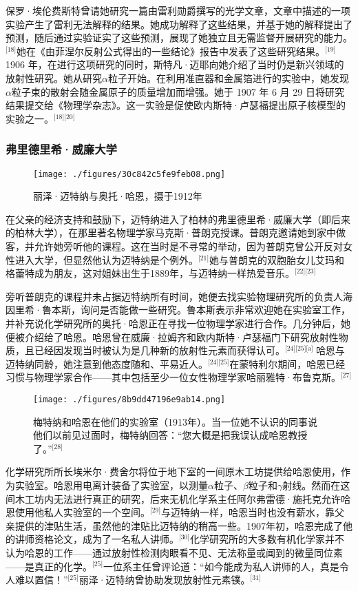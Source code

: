 保罗·埃伦费斯特曾请她研究一篇由雷利勋爵撰写的光学文章，文章中描述的一项实验产生了雷利无法解释的结果。她成功解释了这些结果，并基于她的解释提出了预测，随后通过实验证实了这些预测，展现了她独立且无需监督开展研究的能力。\(^\text{[18]}\)她在《由菲涅尔反射公式得出的一些结论》报告中发表了这些研究结果。\(^\text{[19]}\)1906 年，在进行这项研究的同时，斯特凡·迈耶向她介绍了当时仍是新兴领域的放射性研究。她从研究$\alpha$粒子开始。在利用准直器和金属箔进行的实验中，她发现$\alpha$粒子束的散射会随金属原子的质量增加而增强。她于 1907 年 6 月 29 日将研究结果提交给《物理学杂志》。这一实验是促使欧内斯特·卢瑟福提出原子核模型的实验之一。\(^\text{[18][20]}\)
\subsubsection{弗里德里希·威廉大学}
\begin{figure}[ht]
\centering
\texttt{[image: ./figures/30c842c5fe9feb08.png]}
\caption{丽泽·迈特纳与奥托·哈恩，摄于1912年} \label{fig_LZm_3}
\end{figure}
在父亲的经济支持和鼓励下，迈特纳进入了柏林的弗里德里希·威廉大学（即后来的柏林大学），在那里著名物理学家马克斯·普朗克授课。普朗克邀请她到家中做客，并允许她旁听他的课程。这在当时是不寻常的举动，因为普朗克曾公开反对女性进入大学，但显然他认为迈特纳是个例外。\(^\text{[21]}\)她与普朗克的双胞胎女儿艾玛和格蕾特成为朋友，这对姐妹出生于1889年，与迈特纳一样热爱音乐。\(^\text{[22][23]}\)

旁听普朗克的课程并未占据迈特纳所有时间，她便去找实验物理研究所的负责人海因里希·鲁本斯，询问是否能做一些研究。鲁本斯表示非常欢迎她在实验室工作，并补充说化学研究所的奥托·哈恩正在寻找一位物理学家进行合作。几分钟后，她便被介绍给了哈恩。哈恩曾在威廉·拉姆齐和欧内斯特·卢瑟福门下研究放射性物质，且已经因发现当时被认为是几种新的放射性元素而获得认可。\(^\text{[24][25][a] }\)哈恩与迈特纳同龄，她注意到他态度随和、平易近人。\(^\text{[24][25]}\)在蒙特利尔期间，哈恩已经习惯与物理学家合作——其中包括至少一位女性物理学家哈丽雅特·布鲁克斯。\(^\text{[27]}\)
\begin{figure}[ht]
\centering
\texttt{[image: ./figures/8b9dd47196e9ab14.png]}
\caption{梅特纳和哈恩在他们的实验室（1913年）。当一位她不认识的同事说他们以前见过面时，梅特纳回答：“您大概是把我误认成哈恩教授了。”\(^\text{[28]}\)} \label{fig_LZm_4}
\end{figure}
化学研究所所长埃米尔·费舍尔将位于地下室的一间原木工坊提供给哈恩使用，作为实验室。哈恩用电离计装备了实验室，以测量$\alpha$粒子、$\beta$粒子和$\gamma$射线。然而在这间木工坊内无法进行真正的研究，后来无机化学系主任阿尔弗雷德·施托克允许哈恩使用他私人实验室的一个空间。\(^\text{[29]}\)与迈特纳一样，哈恩当时也没有薪水，靠父亲提供的津贴生活，虽然他的津贴比迈特纳的稍高一些。1907年初，哈恩完成了他的讲师资格论文，成为了一名私人讲师。\(^\text{[30]}\)化学研究所的大多数有机化学家并不认为哈恩的工作——通过放射性检测肉眼看不见、无法称量或闻到的微量同位素——是真正的化学。\(^\text{[25]}\)一位系主任曾评论道：“如今能成为私人讲师的人，真是令人难以置信！”\(^\text{[25]}\)丽泽·迈特纳曾协助发现放射性元素镤。\(^\text{[31]}\)

